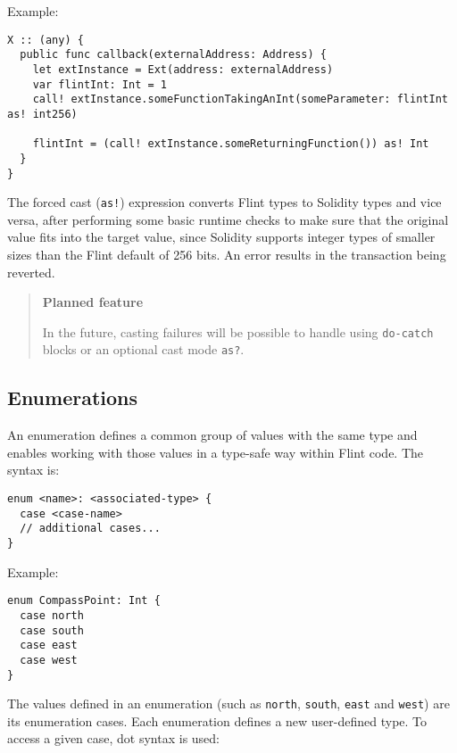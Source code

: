 Example:

\begin{verbatim}
X :: (any) {
  public func callback(externalAddress: Address) {
    let extInstance = Ext(address: externalAddress)
    var flintInt: Int = 1
    call! extInstance.someFunctionTakingAnInt(someParameter: flintInt as! int256)

    flintInt = (call! extInstance.someReturningFunction()) as! Int
  }
}
\end{verbatim}

The forced cast (\texttt{as!}) expression converts Flint types to Solidity types and vice versa, after performing some basic runtime checks to make sure that the original value fits into the target value, since Solidity supports integer types of smaller sizes than the Flint default of 256 bits. An error results in the transaction being reverted.

\begin{quote}
\textbf{Planned feature}

In the future, casting failures will be possible to handle using \texttt{do-catch} blocks or an optional cast mode \texttt{as?}.
\end{quote}

\subsection{Enumerations}
\label{sec:appendix-b-enumerations}

An enumeration defines a common group of values with the same type and enables working with those values in a type-safe way within Flint code. The syntax is:

\begin{verbatim}
enum <name>: <associated-type> {
  case <case-name>
  // additional cases...
}
\end{verbatim}

Example:

\begin{verbatim}
enum CompassPoint: Int {
  case north
  case south
  case east
  case west
}
\end{verbatim}

The values defined in an enumeration (such as \texttt{north}, \texttt{south}, \texttt{east} and \texttt{west}) are its enumeration cases. Each enumeration defines a new user-defined type. To access a given case, dot syntax is used:

